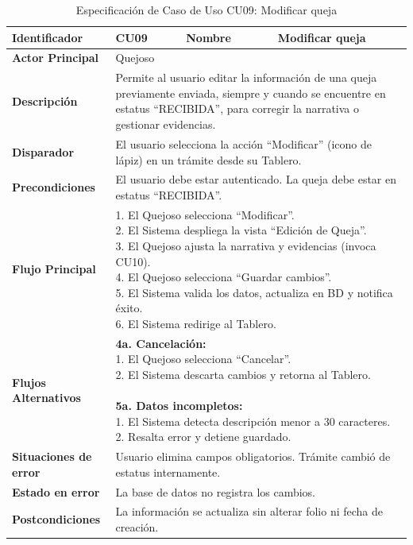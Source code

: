 \begin{longtable}{|p{3.5cm}|p{2cm}|p{2.5cm}|p{7cm}|}
\caption{Especificación de Caso de Uso CU09: Modificar queja}
\label{tab:cu09_modificar_queja} \\
\hline
\textbf{Identificador} & CU09 & \textbf{Nombre} & Modificar queja \\ \hline
\textbf{Actor Principal} & \multicolumn{3}{p{11.5cm}|}{Quejoso} \\ \hline
\textbf{Descripción} & \multicolumn{3}{p{11.5cm}|}{Permite al usuario editar la información de una queja previamente enviada, siempre y cuando se encuentre en estatus ``RECIBIDA'', para corregir la narrativa o gestionar evidencias.} \\ \hline
\textbf{Disparador} & \multicolumn{3}{p{11.5cm}|}{El usuario selecciona la acción ``Modificar'' (icono de lápiz) en un trámite desde su Tablero.} \\ \hline
\textbf{Precondiciones} & \multicolumn{3}{p{11.5cm}|}{El usuario debe estar autenticado. La queja debe estar en estatus ``RECIBIDA''.} \\ \hline
\textbf{Flujo Principal} & \multicolumn{3}{p{11.5cm}|}{1. El Quejoso selecciona ``Modificar''.\newline 2. El Sistema despliega la vista ``Edición de Queja''.\newline 3. El Quejoso ajusta la narrativa y evidencias (invoca CU10).\newline 4. El Quejoso selecciona ``Guardar cambios''.\newline 5. El Sistema valida los datos, actualiza en BD y notifica éxito.\newline 6. El Sistema redirige al Tablero.} \\ \hline
\textbf{Flujos Alternativos} & \multicolumn{3}{p{11.5cm}|}{\textbf{4a. Cancelación:}\newline 1. El Quejoso selecciona ``Cancelar''.\newline 2. El Sistema descarta cambios y retorna al Tablero.\newline\newline \textbf{5a. Datos incompletos:}\newline 1. El Sistema detecta descripción menor a 30 caracteres.\newline 2. Resalta error y detiene guardado.} \\ \hline
\textbf{Situaciones de error} & \multicolumn{3}{p{11.5cm}|}{Usuario elimina campos obligatorios. Trámite cambió de estatus internamente.} \\ \hline
\textbf{Estado en error} & \multicolumn{3}{p{11.5cm}|}{La base de datos no registra los cambios.} \\ \hline
\textbf{Postcondiciones} & \multicolumn{3}{p{11.5cm}|}{La información se actualiza sin alterar folio ni fecha de creación.} \\ \hline
\end{longtable}
\endgroup

